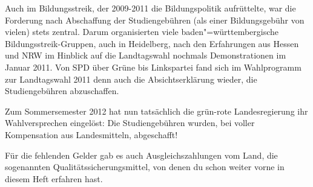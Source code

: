 Auch im Bildungsstreik, der 2009-2011 die Bildungspolitik aufrüttelte, war die
Forderung nach Abschaffung der Studiengebühren (als einer Bildungsgebühr von
vielen) stets zentral. Darum organisierten viele baden"=württembergische
Bildungsstreik-Gruppen, auch in Heidelberg, nach den Erfahrungen aus Hessen und
NRW im Hinblick auf die Landtagswahl nochmals Demonstrationen im Januar 2011.
Von SPD über Grüne bis Linkspartei fand sich im Wahlprogramm zur Landtagswahl
2011 denn auch die Absichtserklärung wieder, die Studiengebühren abzuschaffen.

Zum Sommersemester 2012 hat nun tatsächlich die grün-rote Landesregierung ihr
Wahlversprechen eingelöst: Die Studiengebühren wurden, bei voller Kompensation
aus Landesmitteln, abgeschafft!


Für die fehlenden Gelder gab es auch Ausgleichszahlungen vom Land, die
sogenannten Qualitätssicherungsmittel, von denen du schon weiter vorne in
diesem Heft erfahren hast.
\fi
